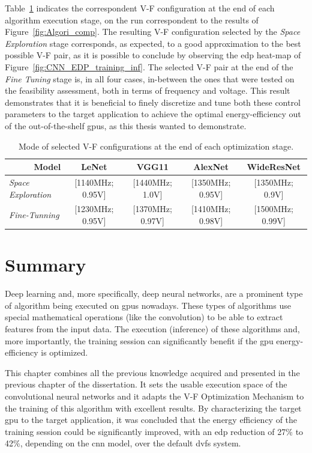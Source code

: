 Table~\ref{tab:bestVF} indicates the correspondent V-F configuration at the end of each algorithm execution stage, on the run correspondent to the results of Figure~\ref{fig:Algori_comp}. The resulting V-F configuration selected by the \textit{Space Exploration} stage corresponds, as expected, to a good approximation to the best possible V-F pair, as it is possible to conclude by observing the \acrshort{edp} heat-map of Figure~\ref{fig:CNN_EDP_training_inf}. 
The selected V-F pair at the end of the \textit{Fine Tuning} stage is, in all four cases, in-between the ones that were tested on the feasibility assessment, both in terms of frequency and voltage. This result demonstrates that it is beneficial to finely discretize and tune both these control parameters to the target application to achieve the optimal energy-efficiency out of the out-of-the-shelf \acrshort{gpu}s, as this thesis wanted to demonstrate.



\begin{table}[htb]
    \centering
    \label{tab:bestVF}
    
    \begin{tabular}{lcccc}
        \multicolumn{1}{r}{{\textbf{Model}}} &  \textbf{LeNet} & \textbf{VGG11} &\textbf{AlexNet} & \textbf{WideResNet} \\ \hline
        \textit{Space Exploration} &  [1140MHz; 0.95V] & [1440MHz; 1.0V] & [1350MHz; 0.95V]  & [1350MHz; 0.9V]\\
        \textit{Fine-Tunning} &  [1230MHz; 0.95V] & [1370MHz; 0.97V] & [1410MHz; 0.98V]  &[1500MHz; 0.99V]\\ \hline
    \end{tabular}%
     \caption{Mode of selected V-F configurations at the end of each optimization stage.}
\end{table}



\section{Summary}

Deep learning and, more specifically, deep neural networks, are a prominent type of algorithm being executed on \acrshort{gpu}s nowadays. These types of algorithms use special mathematical operations (like the convolution) to be able to extract features from the input data. The execution (inference) of these algorithms and, more importantly, the training session can significantly benefit if the \acrshort{gpu} energy-efficiency is optimized.

This chapter combines all the previous knowledge acquired and presented in the previous chapter of the dissertation. It sets the usable execution space of the convolutional neural networks and it adapts the V-F Optimization Mechanism to the training of this algorithm with excellent results. By characterizing the target \acrshort{gpu} to the target application, it was concluded that the energy efficiency of the training session could be significantly improved, with an \acrshort{edp} reduction of 27\% to 42\%, depending on the \acrshort{cnn} model, over the default \acrshort{dvfs} system.
